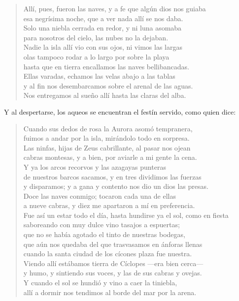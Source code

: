 \documentclass[11pt,a4paper]{article}
\begin{document}
\begin{verse}
Allí, pues, fueron las naves, y a fe que algún dios nos guiaba\\
esa negrísima noche, que a ver nada allí se nos daba.\\
Solo una niebla cerrada en redor, y ni luna asomaba\\
para nosotros del cielo, las nubes no la dejaban.\\
Nadie la isla allí vio con sus ojos, ni vimos las largas\\
olas tampoco rodar a lo largo por sobre la playa\\
hasta que en tierra encallamos las naves bellibancadas.\\
Ellas varadas, echamos las velas abajo a las tablas\\
y al fin nos desembarcamos sobre el arenal de las aguas.\\
Nos entregamos al sueño allí hasta las claras del alba.
\end{verse}

Y al despertarse, los aqueos se encuentran el festín servido, como quien dice:

\begin{verse}
Cuando sus dedos de rosa la Aurora asomó tempranera,\\
fuimos a andar por la isla, mirándolo todo en sorpresa.\\
Las ninfas, hijas de Zeus cabrillante, al pasar nos ojean\\
cabras montesas, y a bien, por aviarle a mi gente la cena.\\
Y ya los arcos recorvos y las azagayas punteras\\
de nuestros barcos sacamos, y en tres dividimos las fuerzas\\
y disparamos; y a gana y contento nos dio un dios las presas.\\
Doce las naves conmigo; tocaron cada una de ellas\\
a nueve cabras, y diez me apartaron a mí en preferencia.\\
Fue así un estar todo el día, hasta hundirse ya el sol, como en fiesta\\
saboreando con muy dulce vino tasajos a espuertas;\\
que no se había agotado el tinto de nuestras bodegas,\\
que aún nos quedaba del que trasvasamos en ánforas llenas\\
cuando la santa ciudad de los cícones plaza fue nuestra.\\
Viendo allí estábamos tierra de Cíclopes ---era bien cerca---\\
y humo, y sintiendo sus voces, y las de sus cabras y ovejas.\\
Y cuando el sol se hundió y vino a caer la tiniebla,\\
allí a dormir nos tendimos al borde del mar por la arena.
\end{verse}
\end{document}
